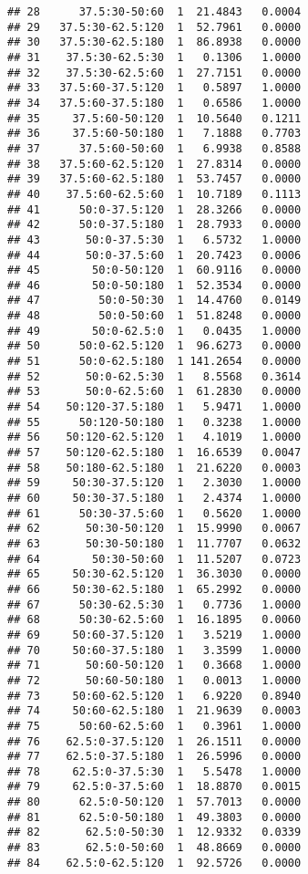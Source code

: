 \begin{knitrout}
\begin{kframe}
\begin{verbatim}
## 28      37.5:30-50:60  1  21.4843   0.0004
## 29   37.5:30-62.5:120  1  52.7961   0.0000
## 30   37.5:30-62.5:180  1  86.8938   0.0000
## 31    37.5:30-62.5:30  1   0.1306   1.0000
## 32    37.5:30-62.5:60  1  27.7151   0.0000
## 33   37.5:60-37.5:120  1   0.5897   1.0000
## 34   37.5:60-37.5:180  1   0.6586   1.0000
## 35     37.5:60-50:120  1  10.5640   0.1211
## 36     37.5:60-50:180  1   7.1888   0.7703
## 37      37.5:60-50:60  1   6.9938   0.8588
## 38   37.5:60-62.5:120  1  27.8314   0.0000
## 39   37.5:60-62.5:180  1  53.7457   0.0000
## 40    37.5:60-62.5:60  1  10.7189   0.1113
## 41      50:0-37.5:120  1  28.3266   0.0000
## 42      50:0-37.5:180  1  28.7933   0.0000
## 43       50:0-37.5:30  1   6.5732   1.0000
## 44       50:0-37.5:60  1  20.7423   0.0006
## 45        50:0-50:120  1  60.9116   0.0000
## 46        50:0-50:180  1  52.3534   0.0000
## 47         50:0-50:30  1  14.4760   0.0149
## 48         50:0-50:60  1  51.8248   0.0000
## 49        50:0-62.5:0  1   0.0435   1.0000
## 50      50:0-62.5:120  1  96.6273   0.0000
## 51      50:0-62.5:180  1 141.2654   0.0000
## 52       50:0-62.5:30  1   8.5568   0.3614
## 53       50:0-62.5:60  1  61.2830   0.0000
## 54    50:120-37.5:180  1   5.9471   1.0000
## 55      50:120-50:180  1   0.3238   1.0000
## 56    50:120-62.5:120  1   4.1019   1.0000
## 57    50:120-62.5:180  1  16.6539   0.0047
## 58    50:180-62.5:180  1  21.6220   0.0003
## 59     50:30-37.5:120  1   2.3030   1.0000
## 60     50:30-37.5:180  1   2.4374   1.0000
## 61      50:30-37.5:60  1   0.5620   1.0000
## 62       50:30-50:120  1  15.9990   0.0067
## 63       50:30-50:180  1  11.7707   0.0632
## 64        50:30-50:60  1  11.5207   0.0723
## 65     50:30-62.5:120  1  36.3030   0.0000
## 66     50:30-62.5:180  1  65.2992   0.0000
## 67      50:30-62.5:30  1   0.7736   1.0000
## 68      50:30-62.5:60  1  16.1895   0.0060
## 69     50:60-37.5:120  1   3.5219   1.0000
## 70     50:60-37.5:180  1   3.3599   1.0000
## 71       50:60-50:120  1   0.3668   1.0000
## 72       50:60-50:180  1   0.0013   1.0000
## 73     50:60-62.5:120  1   6.9220   0.8940
## 74     50:60-62.5:180  1  21.9639   0.0003
## 75      50:60-62.5:60  1   0.3961   1.0000
## 76    62.5:0-37.5:120  1  26.1511   0.0000
## 77    62.5:0-37.5:180  1  26.5996   0.0000
## 78     62.5:0-37.5:30  1   5.5478   1.0000
## 79     62.5:0-37.5:60  1  18.8870   0.0015
## 80      62.5:0-50:120  1  57.7013   0.0000
## 81      62.5:0-50:180  1  49.3803   0.0000
## 82       62.5:0-50:30  1  12.9332   0.0339
## 83       62.5:0-50:60  1  48.8669   0.0000
## 84    62.5:0-62.5:120  1  92.5726   0.0000

\end{verbatim}
\end{kframe}
\end{knitrout}
